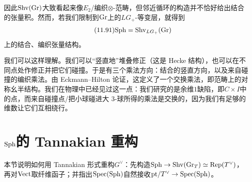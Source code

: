 因此$\mathrm{Shv}(\mathrm{Gr})$大致看起来像$E_2$/编织$\otimes$-范畴，但邻近循环的构造并不恰好给出结合的张量积。然而，若我们限制到$\mathrm{Gr}$上的$LG_+$-等变层，就得到
\begin{equation}\tag{11.91}
\mathrm{Sph}=\mathrm{Shv}_{LG_+}(\mathrm{Gr})
\end{equation}
上的结合、编织张量结构。

我们可以这样理解。我们可以“竖直地”堆叠修正（这是 Hecke 结构），也可以在不同点处作修正并把它们碰撞。于是有三个乘法方向：结合的竖直方向，以及来自碰撞的编织乘法。由 Eckmann–Hilton 论证，这定义了一个交换乘法，即范畴上的对称幺半结构。我们在物理中已经见过这一点：我们研究的是余维$1$缺陷，即$C\times I$中的点，而来自碰撞点/把小球碰进大 3-球所得的乘法是交换的，因为我们有足够的维数让它们互相绕行。


\section{$\mathrm{Sph}$的 Tannakian 重构}\label{sec:11-5}

\begin{sectionkey}
本节说明如何用 Tannakian 形式重构$G^{\vee}$：先构造$\mathrm{Sph}\to\mathrm{Shv}(\mathrm{Gr}_T)\simeq\mathrm{Rep}(T^{\vee})$，再对$\mathrm{Vect}$取纤维函子；并指出$\mathrm{Spec}(\mathrm{Sph})$自然接收$\mathrm{pt}/T^{\vee}\to\mathrm{Spec}(\mathrm{Sph})$。
\end{sectionkey}


